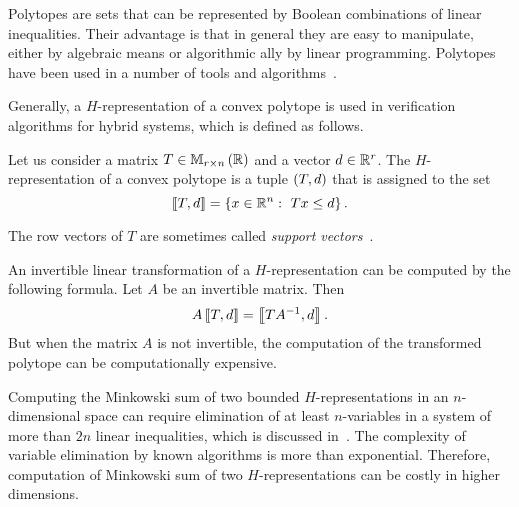 Polytopes are sets that can be represented by Boolean combinations of
linear inequalities.  Their advantage is that in general they are easy
to manipulate, either by algebraic means or algorithmic ally by linear
programming.  Polytopes have been used in a number of tools and
algorithms~\cite{todo}.  %




Generally, a $H$-representation of a convex polytope is used in
verification algorithms for hybrid systems, which is defined as
follows.
%
\begin{definition}[$H$-representation]
Let us consider a matrix $T\in\mathbb{M}_{r\times n}\left(\mathbb{R}\right)$ and a vector $d\in\mathbb{R}^r$.
The $H$-representation of a convex polytope is a tuple $\left(T,d\right)$
that is assigned to the set
%
\[
\left\llbracket T,d\right\rrbracket=\left\{x\in\mathbb{R}^n:~Tx\leq d\right\}.
\]
%
\end{definition}
%
The row vectors of $T$ are sometimes called \emph{support vectors}~\cite{todo}.

An invertible linear transformation of a $H$-representation can be
computed by the following formula.  Let $A$ be an invertible matrix.
Then
%
\[
A\left\llbracket T,d\right\rrbracket=\left\llbracket TA^{-1},d\right\rrbracket.
\]
%
But when the matrix $A$ is not invertible, the computation of the
transformed polytope can be computationally expensive.

Computing the Minkowski sum of two bounded $H$-representations in an
$n$-dimensional space can require elimination of at least
$n$-variables in a system of more than $2n$ linear inequalities, which
is discussed in~\cite{kvasnica2005minkowski}.  The complexity of
variable elimination by known algorithms is more than exponential.
Therefore, computation of Minkowski sum of two $H$-representations can
be costly in higher dimensions.

